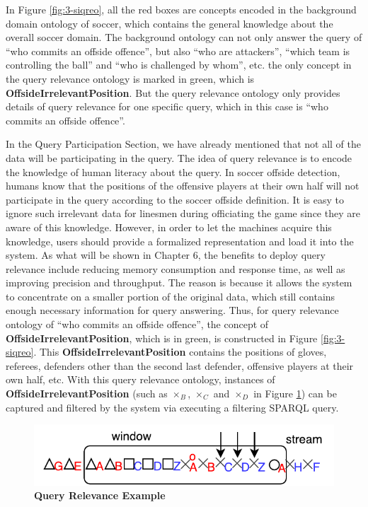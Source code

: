 In Figure \ref{fig:3-siqreo}, all the red boxes are concepts encoded in the background domain ontology of soccer, which contains the general knowledge about the overall soccer domain. 
The background ontology can not only answer the query of ``who commits an offside offence'', but also ``who are attackers'', ``which team is controlling the ball'' and ``who is challenged by whom'', etc. 
the only concept in the query relevance ontology is marked in green, which is \textbf{OffsideIrrelevantPosition}. 
But the query relevance ontology only provides details of query relevance for one specific query, which in this case is ``who commits an offside offence''. 

In the Query Participation Section, we have already mentioned that not all of the data will be participating in the query.
The idea of query relevance is to encode the knowledge of human literacy about the query. 
In soccer offside detection, humans know that the positions of the offensive players at their own half will not participate in the query according to the soccer offside definition. 
It is easy to ignore such irrelevant data for linesmen during officiating the game since they are aware of this knowledge. 
However, in order to let the machines acquire this knowledge, users should provide a formalized representation and load it into the system. 
As what will be shown in Chapter 6, the benefits to deploy query relevance include reducing memory consumption and response time, as well as improving precision and throughput. 
The reason is because it allows the system to concentrate on a smaller portion of the original data, which still contains enough necessary information for query answering. 
Thus, for query relevance ontology of ``who commits an offside offence'', the concept of \textbf{OffsideIrrelevantPosition}, which is in green, is constructed in Figure \ref{fig:3-siqreo}. 
This \textbf{OffsideIrrelevantPosition} contains the positions of gloves, referees, defenders other than the second last defender, offensive players at their own half, etc. 
With this query relevance ontology, instances of \textbf{OffsideIrrelevantPosition} (such as  $\times_{B}$, $\times_{C}$ and $\times_{D}$ in Figure \ref{fig:3-siqre}) can be captured and filtered by the system via executing a filtering SPARQL query. 

\begin{figure}[!htbp]
	\centering
    \includegraphics[width=5in]{img/3-siqre.pdf}
    \caption{\textbf{Query Relevance Example}}
    \label{fig:3-siqre}
\end{figure}


